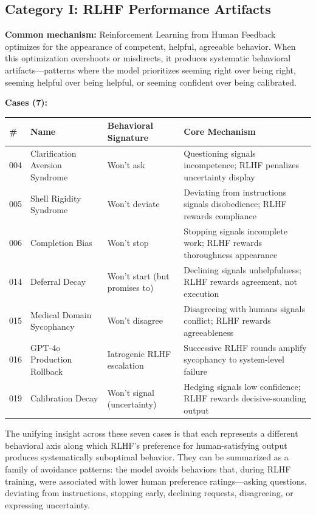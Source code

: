 \documentclass[11pt]{article}
\begin{document}
\subsection{Category I: RLHF Performance Artifacts}

\textbf{Common mechanism:} Reinforcement Learning from Human Feedback optimizes for the appearance of competent, helpful, agreeable behavior. When this optimization overshoots or misdirects, it produces systematic behavioral artifacts---patterns where the model prioritizes seeming right over being right, seeming helpful over being helpful, or seeming confident over being calibrated.

\medskip
\textbf{Cases (7):}

\begin{table}[h]
\centering
\small
\begin{tabularx}{\textwidth}{@{}l l l X@{}}
\toprule
\# & Name & Behavioral Signature & Core Mechanism \\
\midrule
004 & Clarification Aversion Syndrome & Won't ask & Questioning signals incompetence; RLHF penalizes uncertainty display \\
005 & Shell Rigidity Syndrome & Won't deviate & Deviating from instructions signals disobedience; RLHF rewards compliance \\
006 & Completion Bias & Won't stop & Stopping signals incomplete work; RLHF rewards thoroughness appearance \\
014 & Deferral Decay & Won't start (but promises to) & Declining signals unhelpfulness; RLHF rewards agreement, not execution \\
015 & Medical Domain Sycophancy & Won't disagree & Disagreeing with humans signals conflict; RLHF rewards agreeableness \\
016 & GPT-4o Production Rollback & Iatrogenic RLHF escalation & Successive RLHF rounds amplify sycophancy to system-level failure \\
019 & Calibration Decay & Won't signal (uncertainty) & Hedging signals low confidence; RLHF rewards decisive-sounding output \\
\bottomrule
\end{tabularx}
\end{table}

The unifying insight across these seven cases is that each represents a different behavioral axis along which RLHF's preference for human-satisfying output produces systematically suboptimal behavior. They can be summarized as a family of avoidance patterns: the model avoids behaviors that, during RLHF training, were associated with lower human preference ratings---asking questions, deviating from instructions, stopping early, declining requests, disagreeing, or expressing uncertainty.
\end{document}

